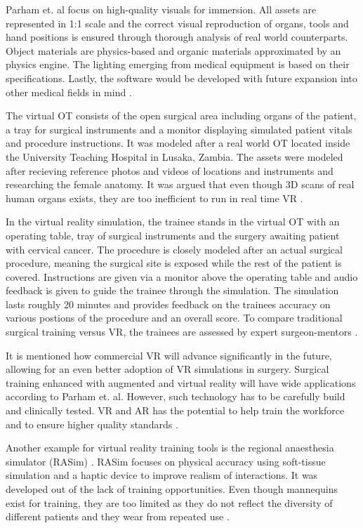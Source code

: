 Parham et. al focus on high-quality visuals for immersion.
All assets are represented in 1:1 scale and the correct visual reproduction of organs, tools and hand positions is ensured through thorough analysis of real world counterparts.
Object materials are physics-based and organic materials approximated by an physics engine.
The lighting emerging from medical equipment is based on their specifications.
Lastly, the software would be developed with future expansion into other medical fields in mind \cite{RN52}.

The virtual OT consists of the open surgical area including organs of the patient, a tray for surgical instruments and a monitor displaying simulated patient vitals and procedure instructions.
It was modeled after a real world OT located inside the University Teaching Hospital in Lusaka, Zambia.
The assets were modeled after recieving reference photos and videos of locations and instruments and researching the female anatomy.
It was argued that even though 3D scans of real human organs exists, they are too inefficient to run in real time VR \cite{RN52}.

In the virtual reality simulation, the trainee stands in the virtual OT with an operating table, tray of surgical instruments and the surgery awaiting patient with cervical cancer.
The procedure is closely modeled after an actual surgical procedure, meaning the surgical site is exposed while the rest of the patient is covered.
Instructions are given via a monitor above the operating table and audio feedback is given to guide the trainee through the simulation.
The simulation lasts roughly 20 minutes and provides feedback on the trainees accuracy on various postions of the procedure and an overall score.
To compare traditional surgical training versus VR, the trainees are assessed by expert surgeon-mentors \cite{RN52}.

It is mentioned how commercial VR will advance significantly in the future, allowing for an even better adoption of VR simulations in surgery.
Surgical training enhanced with augmented and virtual reality will have wide applications according to Parham et. al.
However, such technology has to be carefully build and clinically tested.
VR and AR has the potential to help train the workforce and to ensure higher quality standards \cite{RN52}.

Another example for virtual reality training tools is the regional anaesthesia simulator (RASim) \cite{RN70}.
RASim focuses on physical accuracy using soft-tissue simulation and a haptic device to improve realism of interactions.
It was developed out of the lack of training opportunities. Even though mannequins exist for training, they are too limited 
as they do not reflect the diversity of different patients and they wear from repeated use \cite{RN70}.

